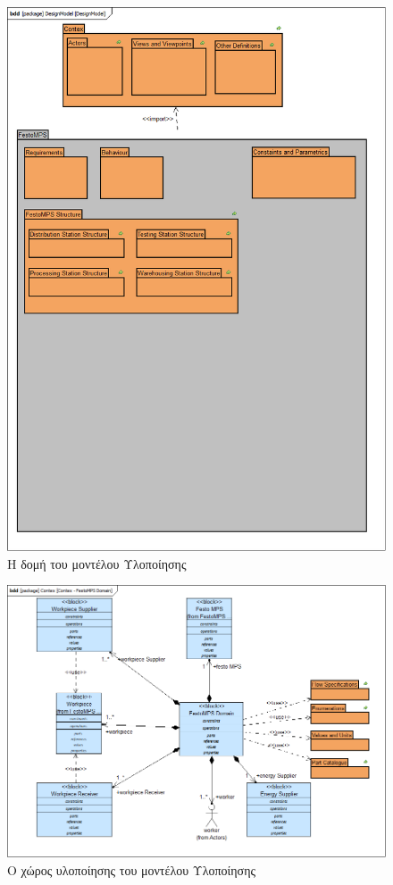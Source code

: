 \documentclass[a4paper,12pt,twoside]{report}
\begin{document}
\begin{appendices}
				\clearpage
				\begin{figure}[hp]
					\centering
					\includegraphics[scale=0.45]{DesignModel_DesignModel.png}
					\caption{Η δομή του μοντέλου Υλοποίησης}
					\label{φωτ:Η δομή του μοντέλου Υλοποίησης}
				\end{figure}
				
				\begin{figure}[hp]
					\centering
					\includegraphics[scale=0.45]{DesignModel_Contex-FestoMPSDomain.png}
					\caption{Ο χώρος υλοποίησης του μοντέλου Υλοποίησης}
					\label{φωτ:Ο χώρος υλοποίησης του μοντέλου Υλοποίησης}
				\end{figure}
				

\end{appendices}
\end{document}
